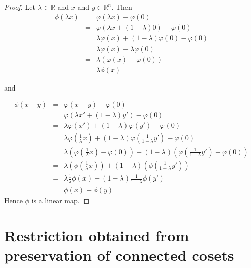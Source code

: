 \documentclass[honours]{UNSWthesis}
\newcommand{\R}{\mathbb{R}}
\newcommand{\1}{\mathbf{e}_{1}}
\newcommand{\2}{\mathbf{e}_{3}}
\newcommand{\3}{\mathbf{e}_{3}}
\begin{document}
\begin{proof}
Let $\lambda \in \R$ and $x$ and $y \in \R^{n}$. Then 
\begin{eqnarray*}
\phi(\lambda x) &=& \varphi(\lambda x) - \varphi(0) \\
&=& \varphi(\lambda x +(1-\lambda)0)-\varphi(0) \\
&=& \lambda \varphi(x)+(1-\lambda)\varphi(0) -\varphi(0) \\
&=& \lambda \varphi(x)-\lambda\varphi(0) \\
&=& \lambda (\varphi(x)-\varphi(0)) \\
&=& \lambda \phi(x) 
\end{eqnarray*}

and

\begin{eqnarray*}
\phi(x+y) &=& \varphi(x+y)-\varphi(0) \\
&=& \varphi(\lambda x' + (1-\lambda)y') -\varphi(0) \\
&=& \lambda \varphi( x') + (1-\lambda)\varphi(y') -\varphi(0) \\
&=& \lambda \varphi(\frac{1}{\lambda} x) + (1-\lambda)\varphi(\frac{1}{1-\lambda} y') -\varphi(0) \\
&=& \lambda (\varphi(\frac{1}{\lambda} x) -\varphi(0)) + (1-\lambda)(\varphi(\frac{1}{1-\lambda} y')-\varphi(0))  \\
&=& \lambda (\phi(\frac{1}{\lambda} x) ) + (1-\lambda)(\phi(\frac{1}{1-\lambda} y'))  \\
&=& \lambda \frac{1}{\lambda} \phi( x)  + (1-\lambda)\frac{1}{1-\lambda} \phi( y')  \\
&=& \phi(x)+\phi(y)
\end{eqnarray*}
Hence $\phi$ is a linear map.
\end{proof} 



\section{Restriction obtained from preservation of connected cosets}
\end{document}
